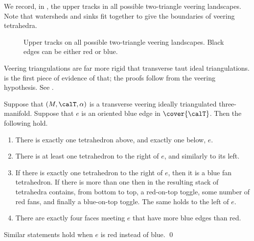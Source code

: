 \documentclass[12pt]{amsart}
\begin{document}
We record, in , the upper tracks in all possible two-triangle veering landscapes.  Note that watersheds and sinks fit together to give the boundaries of veering tetrahedra.  

\begin{figure}[htbp]
\quad
{}

\quad
{}
\quad
{}
\caption{Upper tracks on all possible two-triangle veering landscapes.  Black edges can be either red or blue.}
\label{Fig:PossibleTwoTriangles}
\end{figure}

Veering triangulations are far more rigid that transverse taut ideal triangulations.   is the first piece of evidence of that; the proofs follow from the veering hypothesis.  See .

\begin{lemma}
\label{Lem:EdgeNeighbourhood}
Suppose that $(M, \calT, \alpha)$ is a transverse veering ideally triangulated three-manifold.  
Suppose that $e$ is an oriented blue edge in $\cover{\calT}$.  Then the following hold.  
\begin{enumerate}
\item
There is exactly one tetrahedron above, and exactly one below, $e$.  
\item
There is at least one tetrahedron to the right of $e$, and similarly to its left.  
\label{Itm:HalfEdgeDegreeAtLeastOne}
\item
If there is exactly one tetrahedron to the right of $e$, then it is a blue fan tetrahedron.  If there is more than one then in the resulting stack of tetrahedra contains, from bottom to top, a red-on-top toggle, some number of red fans, and finally a blue-on-top toggle.  The same holds to the left of $e$. 
\item
There are exactly four faces meeting $e$ that have more blue edges than red.
\end{enumerate}
Similar statements hold when $e$ is red instead of blue. \qed
\end{lemma}
\end{document}

